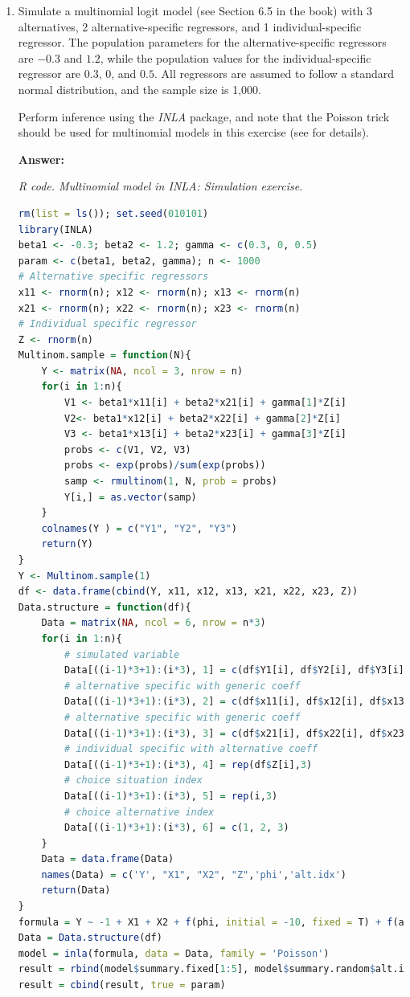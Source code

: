 \begin{enumerate}[leftmargin=*]
\item Simulate a multinomial logit model (see Section 6.5 in the book) with 3 alternatives, 2 alternative-specific regressors, and 1 individual-specific regressor. The population parameters for the alternative-specific regressors are $-0.3$ and $1.2$, while the population values for the individual-specific regressor are $0.3$, $0$, and $0.5$. All regressors are assumed to follow a standard normal distribution, and the sample size is 1,000. 

Perform inference using the \textit{INLA} package, and note that the Poisson trick should be used for multinomial models in this exercise (see \cite{serafini2019multinomial} for details).

\textbf{Answer:}

\begin{tcolorbox}[enhanced,width=4.67in,center upper,
	fontupper=\large\bfseries,drop shadow southwest,sharp corners]
	\textit{R code. Multinomial model in INLA: Simulation exercise.}
	\begin{VF}
		\begin{lstlisting}[language=R]
rm(list = ls()); set.seed(010101)
library(INLA)
beta1 <- -0.3; beta2 <- 1.2; gamma <- c(0.3, 0, 0.5)
param <- c(beta1, beta2, gamma); n <- 1000
# Alternative specific regressors
x11 <- rnorm(n); x12 <- rnorm(n); x13 <- rnorm(n)
x21 <- rnorm(n); x22 <- rnorm(n); x23 <- rnorm(n)
# Individual specific regressor
Z <- rnorm(n)
Multinom.sample = function(N){
	Y <- matrix(NA, ncol = 3, nrow = n)
	for(i in 1:n){
		V1 <- beta1*x11[i] + beta2*x21[i] + gamma[1]*Z[i]
		V2<- beta1*x12[i] + beta2*x22[i] + gamma[2]*Z[i]
		V3 <- beta1*x13[i] + beta2*x23[i] + gamma[3]*Z[i]
		probs <- c(V1, V2, V3)
		probs <- exp(probs)/sum(exp(probs))
		samp <- rmultinom(1, N, prob = probs)
		Y[i,] = as.vector(samp)
	}
	colnames(Y ) = c("Y1", "Y2", "Y3")
	return(Y)
}
Y <- Multinom.sample(1)
df <- data.frame(cbind(Y, x11, x12, x13, x21, x22, x23, Z))
Data.structure = function(df){
	Data = matrix(NA, ncol = 6, nrow = n*3)
	for(i in 1:n){
		# simulated variable
		Data[((i-1)*3+1):(i*3), 1] = c(df$Y1[i], df$Y2[i], df$Y3[i])
		# alternative specific with generic coeff
		Data[((i-1)*3+1):(i*3), 2] = c(df$x11[i], df$x12[i], df$x13[i])
		# alternative specific with generic coeff
		Data[((i-1)*3+1):(i*3), 3] = c(df$x21[i], df$x22[i], df$x23[i])
		# individual specific with alternative coeff
		Data[((i-1)*3+1):(i*3), 4] = rep(df$Z[i],3)
		# choice situation index
		Data[((i-1)*3+1):(i*3), 5] = rep(i,3)
		# choice alternative index
		Data[((i-1)*3+1):(i*3), 6] = c(1, 2, 3)
	}
	Data = data.frame(Data)
	names(Data) = c('Y', "X1", "X2", "Z",'phi','alt.idx')
	return(Data)
}
formula = Y ~ -1 + X1 + X2 + f(phi, initial = -10, fixed = T) + f(alt.idx, Z, fixed = T, constr = T)
Data = Data.structure(df)
model = inla(formula, data = Data, family = 'Poisson')
result = rbind(model$summary.fixed[1:5], model$summary.random$alt.idx[2:6])
result = cbind(result, true = param)
\end{lstlisting}
	\end{VF}
\end{tcolorbox}



\end{enumerate}
